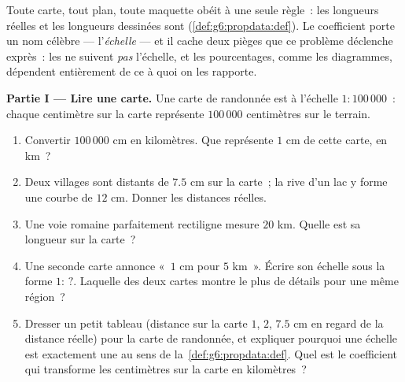 \begin{problem}
\label{pb:g6:propdata:1}
Toute carte, tout plan, toute maquette obéit à une seule règle~: les
longueurs réelles et les longueurs dessinées sont
\emph{} (\cref{def:g6:propdata:def}). Le coefficient
porte un nom célèbre --- l'\emph{échelle} --- et il
cache deux pièges que ce problème déclenche exprès~: les  ne
suivent \emph{pas} l'échelle, et les pourcentages, comme les
diagrammes, dépendent entièrement de ce à quoi on les rapporte.

\medskip
\noindent\textbf{Partie I --- Lire une carte.}
Une carte de randonnée est à l'échelle $1:100\,000$~: chaque
centimètre sur la carte représente $100\,000$ centimètres sur le
terrain.
\begin{enumerate}
  \item Convertir $100\,000$ cm en kilomètres. Que représente $1$ cm
        de cette carte, en km~?
  \item Deux villages sont distants de $7.5$ cm sur la carte~; la
        rive d'un lac y forme une courbe de $12$ cm. Donner les
        distances réelles.
  \item Une voie romaine parfaitement rectiligne mesure $20$ km.
        Quelle est sa longueur sur la carte~?
  \item Une seconde carte annonce «~$1$ cm pour $5$ km~». Écrire son
        échelle sous la forme $1: \,?$. Laquelle des deux cartes
        montre le plus de détails pour une même région~?
  \item Dresser un petit tableau (distance sur la carte $1$, $2$,
        $7.5$ cm en regard de la distance réelle) pour la carte de
        randonnée, et expliquer pourquoi une échelle est exactement
        une  au sens de la~\cref{def:g6:propdata:def}.
        Quel est le coefficient qui transforme les centimètres sur
        la carte en kilomètres~?
\end{enumerate}


\end{problem}
